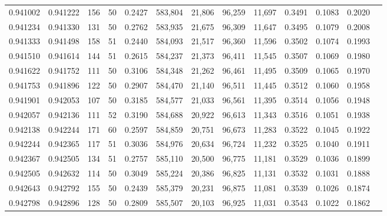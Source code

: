 \begin{tabular}{rrrrrrrrrrrrr}
0.941002 & 0.941222 &   156 &  50 &                                     0.2427 & 583,804 &  21,806 &  96,259 &  11,697 & 0.3491 & 0.1083 & 0.2020 \\
0.941234 & 0.941330 &   131 &  50 &                                     0.2762 & 583,935 &  21,675 &  96,309 &  11,647 & 0.3495 & 0.1079 & 0.2008 \\
0.941333 & 0.941498 &   158 &  51 &                                     0.2440 & 584,093 &  21,517 &  96,360 &  11,596 & 0.3502 & 0.1074 & 0.1993 \\
0.941510 & 0.941614 &   144 &  51 &                                     0.2615 & 584,237 &  21,373 &  96,411 &  11,545 & 0.3507 & 0.1069 & 0.1980 \\
0.941622 & 0.941752 &   111 &  50 &                                     0.3106 & 584,348 &  21,262 &  96,461 &  11,495 & 0.3509 & 0.1065 & 0.1970 \\
0.941753 & 0.941896 &   122 &  50 &                                     0.2907 & 584,470 &  21,140 &  96,511 &  11,445 & 0.3512 & 0.1060 & 0.1958 \\
0.941901 & 0.942053 &   107 &  50 &                                     0.3185 & 584,577 &  21,033 &  96,561 &  11,395 & 0.3514 & 0.1056 & 0.1948 \\
0.942057 & 0.942136 &   111 &  52 &                                     0.3190 & 584,688 &  20,922 &  96,613 &  11,343 & 0.3516 & 0.1051 & 0.1938 \\
0.942138 & 0.942244 &   171 &  60 &                                     0.2597 & 584,859 &  20,751 &  96,673 &  11,283 & 0.3522 & 0.1045 & 0.1922 \\
0.942244 & 0.942365 &   117 &  51 &                                     0.3036 & 584,976 &  20,634 &  96,724 &  11,232 & 0.3525 & 0.1040 & 0.1911 \\
0.942367 & 0.942505 &   134 &  51 &                                     0.2757 & 585,110 &  20,500 &  96,775 &  11,181 & 0.3529 & 0.1036 & 0.1899 \\
0.942505 & 0.942632 &   114 &  50 &                                     0.3049 & 585,224 &  20,386 &  96,825 &  11,131 & 0.3532 & 0.1031 & 0.1888 \\
0.942643 & 0.942792 &   155 &  50 &                                     0.2439 & 585,379 &  20,231 &  96,875 &  11,081 & 0.3539 & 0.1026 & 0.1874 \\
0.942798 & 0.942896 &   128 &  50 &                                     0.2809 & 585,507 &  20,103 &  96,925 &  11,031 & 0.3543 & 0.1022 & 0.1862 \\

\end{tabular}
